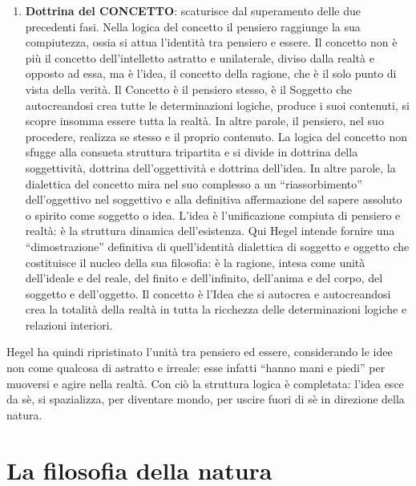 \documentclass[a4paper,12pt,oneside,openany]{book}%
\begin{document}
\begin{enumerate}
	\item \textbf{Dottrina del CONCETTO}: scaturisce dal superamento delle due precedenti fasi. Nella logica del concetto il pensiero raggiunge la sua compiutezza, ossia si attua l’identità tra pensiero e essere. Il concetto non è più il concetto dell’intelletto astratto e unilaterale, diviso dalla realtà e opposto ad essa, ma è l’idea, il concetto della ragione, che è il solo punto di vista della verità. Il Concetto è il pensiero stesso, è il Soggetto che autocreandosi crea tutte le determinazioni logiche, produce i suoi contenuti, si scopre insomma essere tutta la realtà. In altre parole, il pensiero, nel suo procedere, realizza se stesso e il proprio contenuto. La logica del concetto non sfugge alla consueta struttura tripartita e si divide in dottrina della soggettività, dottrina dell’oggettività e dottrina dell’idea. In altre parole, la dialettica del concetto mira nel suo complesso a un “riassorbimento” dell’oggettivo nel soggettivo e alla definitiva affermazione del sapere assoluto o spirito come soggetto o idea. L’idea è l’unificazione compiuta di pensiero e realtà: è la struttura dinamica dell’esistenza. Qui Hegel intende fornire una “dimostrazione” definitiva di quell’identità dialettica di soggetto e oggetto che costituisce il nucleo della sua filosofia: è la ragione, intesa come unità dell’ideale e del reale, del finito e dell’infinito, dell’anima e del corpo, del soggetto e dell’oggetto. Il concetto è l’Idea che si autocrea e autocreandosi crea la totalità della realtà in tutta la ricchezza delle determinazioni logiche e relazioni interiori.
\end{enumerate}

Hegel ha quindi ripristinato l’unità tra pensiero ed essere, considerando le idee non come qualcosa di astratto e irreale: esse infatti “hanno mani e piedi” per muoversi e agire nella realtà. Con ciò la struttura logica è completata: l’idea esce da sè, si spazializza, per diventare mondo, per uscire fuori di sè in direzione della natura.
\newpage

\section*{La filosofia della natura}
\end{document}
